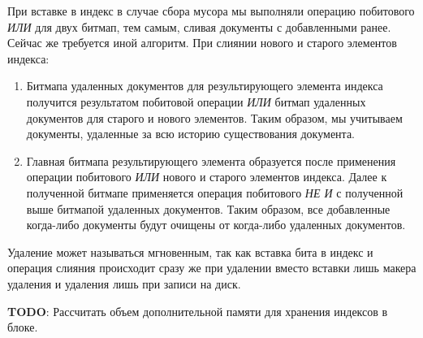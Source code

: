 При вставке в индекс в случае сбора мусора мы выполняли операцию побитового
\textit{ИЛИ} для двух битмап, тем самым, сливая документы с добавленными ранее.
Сейчас же требуется иной алгоритм. При слиянии нового и старого элементов
индекса:
\begin{enumerate}
    \item Битмапа удаленных документов для результирующего элемента индекса
    получится результатом побитовой операции \textit{ИЛИ} битмап удаленных
    документов для старого и нового элементов. Таким образом, мы учитываем
    документы, удаленные за всю историю существования документа.
    \item Главная битмапа результирующего элемента образуется после применения
    операции побитового \textit{ИЛИ} нового и старого элементов индекса. Далее к 
    полученной битмапе применяется операция побитового \textit{НЕ И} с полученной
    выше битмапой удаленных документов. Таким образом, все добавленные когда-либо
    документы будут очищены от когда-либо удаленных документов. 
\end{enumerate}

Удаление может называться мгновенным, так как вставка бита в индекс и операция
слияния происходит сразу же при удалении вместо вставки лишь макера удаления и
удаления лишь при записи на диск.

\textbf{TODO}: Рассчитать объем дополнительной памяти для хранения индексов в блоке.
